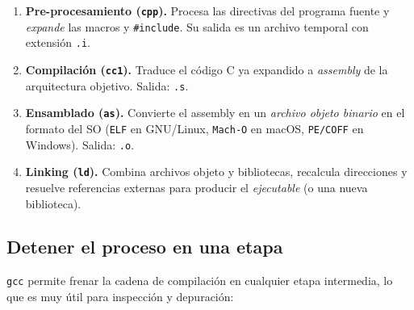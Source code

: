 \documentclass[11pt,a4paper]{article}
\begin{document}
\begin{enumerate}[leftmargin=*]
    \item \textbf{Pre-procesamiento (\texttt{cpp}).} Procesa las
        directivas del programa fuente y \emph{expande} las macros y
        \texttt{\#include}. Su salida es un archivo temporal con
        extensión \texttt{.i}.
    \item \textbf{Compilación (\texttt{cc1}).} Traduce el código C ya
        expandido a \emph{assembly} de la arquitectura objetivo.
        Salida: \texttt{.s}.
    \item \textbf{Ensamblado (\texttt{as}).} Convierte el assembly en
        un \emph{archivo objeto binario} en el formato del SO
        (\texttt{ELF} en GNU/Linux, \texttt{Mach-O} en macOS,
        \texttt{PE/COFF} en Windows). Salida: \texttt{.o}.
    \item \textbf{Linking (\texttt{ld}).} Combina archivos objeto y
        bibliotecas, recalcula direcciones y resuelve referencias
        externas para producir el \emph{ejecutable} (o una nueva
        biblioteca).
\end{enumerate}

\begin{center}
\end{center}

\subsection{Detener el proceso en una etapa}

\texttt{gcc} permite frenar la cadena de compilación en cualquier
etapa intermedia, lo que es muy útil para inspección y depuración:
\end{document}
